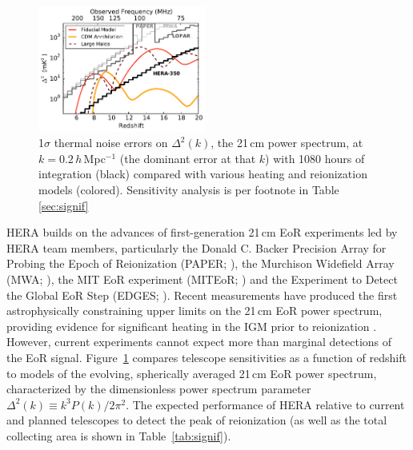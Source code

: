 \documentclass[preprint,11pt]{aastex}
\begin{document}
\begin{figure}[h!]
\centering
    \includegraphics[width=0.49\textwidth,clip]{plots/sensitivity_wideband.pdf}
  \caption{ 1$\sigma$ thermal noise errors on $\Delta^2(k)$, the 21\,cm power spectrum, at $k\!=\!0.2$\,$h$\,Mpc$^{-1}$ (the dominant error at that $k$)
with 1080 hours of integration (black)
compared with various heating and reionization models (colored).  Sensitivity analysis is per footnote in Table \ref{sec:signif}}
	\label{fig:Sensitivities}
\end{figure}

HERA builds on the advances of first-generation
21\,cm EoR experiments led by HERA team members, particularly 
the Donald C. Backer Precision Array for Probing the Epoch of Reionization (PAPER; \citealt{parsons_et_al2010}),
the Murchison Widefield Array (MWA; \citealt{bowman_et_al2012,tingay_et_al2013}),
the MIT EoR experiment (MITEoR; \citealt{zheng_et_al2014}) and the Experiment to Detect the Global EoR Step (EDGES; \citealt{bowman_rogers2010}).
Recent measurements
have produced the first astrophysically constraining upper limits on the 21\,cm EoR power spectrum, 
providing evidence for significant heating in the IGM prior to reionization \citep{parsons_etal2014, parsons_et_al2015, ali_et_al2015,pober_et_al2015}.
However, current experiments cannot expect more than marginal detections of the EoR signal. 
Figure~\ref{fig:Sensitivities} compares telescope sensitivities as a function of redshift to models of 
the evolving, spherically averaged 21\,cm EoR power spectrum, characterized by the dimensionless power spectrum parameter $\Delta^2 (k) \equiv k^3 P(k) / 2 \pi^2$.
The expected performance of HERA relative to current and planned telescopes to detect the peak of reionization (as well as the total collecting area is shown in 
Table~\ref{tab:signif}).  


\end{document}
